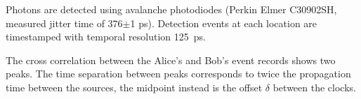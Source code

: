 \documentclass[aps,pra,onecolumn, superscriptaddress]{revtex4}
\begin{document}
Photons are detected using avalanche photodiodes (Perkin Elmer C30902SH, measured jitter time of 376$\pm$1 ps).
Detection events at each location are timestamped with temporal resolution 125~ps.



The cross correlation between the Alice's and Bob's event records shows two peaks.   The time separation between peaks corresponds to twice the propagation time between the sources, the midpoint instead is the offset $\delta$ between the clocks.



\end{document}
